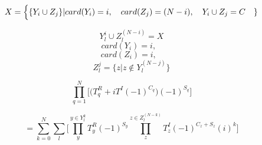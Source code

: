 \documentclass[12pt]{article}
\begin{document}
\begin{equation}
X = \Big{\{ } \{ Y_{i} \cup Z_{j} \} |
 card(Y_{i})=i, \text{ \ \ }
 card(Z_{j})=(N-i), \text{ \ \ }
 Y_{i}\cup Z_{j} = C \text{ \ \ }
\}
\end{equation}

\begin{equation}
Y^{i}_{l} \cup Z^{(N-i)}_{l} =  X
\end{equation}
\begin{equation}
 card(Y_{i})=i, \text{ \ \ }
\end{equation}
\begin{equation}
 card(Z_{i})=i, \text{ \ \ }
\end{equation}
\begin{equation}
Z^{j}_{l} = \{ z | z \notin Y^{(N-j)}_{l}  \}
\end{equation}


\begin{equation}
\prod_{q=1}^{N}\Big[\Big( T_{q}^{R} +iT^{I}(-1)^{C_{q}}\Big) (-1)^{S_{q}}\Big]
\end{equation}

\begin{equation}
=\sum_{k=0}^{N}\sum_{l} \Big[
\prod_{y}^{y\in Y_{l}^{k}} T_{y}^{R}
(-1)^{S_{y}}
\prod_{z}^{z\in Z_{l}^{(N-k)}} T^{I}_{z}(-1)^{C_{z}+S_{z}}(i)^{k} \Big]
\end{equation}
\end{document}
